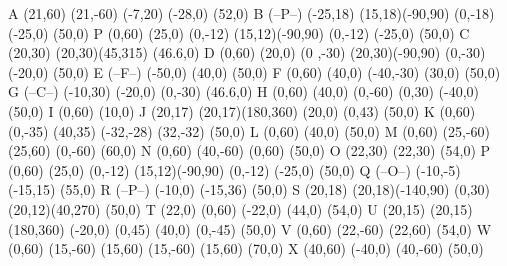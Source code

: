 {\DefineSymbol A{{ \Line(21,60)
   \Line(21,-60)  \Move(-7,20)
   \Line(-28,0) } \Move(52,0)  }
\DefineSymbol B{{ \DrawText(--P--)
   \Move(-25,18)
   \DrawOvalArc(15,18)(-90,90)
   \Move(0,-18)   \Line(-25,0)}
   \Move(50,0) }    \DefineSymbol P
{{      \Line(0,60)    \Line(25,0)
     \Move(0,-12) \DrawOvalArc(15,12)(-90,90)
     \Move(0,-12)  \Line(-25,0) }      \Move(50,0)  }
 \DefineSymbol C{{     \Move(20,30) 
     \DrawOvalArc(20,30)(45,315) }    \Move(46.6,0)  }
 \DefineSymbol D{{    \Line(0,60)    \Line(20,0)
     \Move(0 ,-30) \DrawOvalArc(20,30)(-90,90) \Move(0,-30)
     \Line(-20,0) }   \Move(50,0)  }
 \DefineSymbol E{{  \DrawText(--F--)  \Move(-50,0)
     \Line(40,0) }  \Move(50,0)      }
 \DefineSymbol F{{   \Line(0,60)   \Line(40,0)
     \Move(-40,-30) \Line(30,0)  }  \Move(50,0)     }
 \DefineSymbol G{{ \DrawText(--C--)
    \Move(-10,30) {\Line(-20,0)} \Line(0,-30)   } 
    \Move(46.6,0)     }
 \DefineSymbol H{{ \Line(0,60)  \Move(40,0) 
    \Line(0,-60)  \Move(0,30)  \Line(-40,0)   }  \Move(50,0)     }
 \DefineSymbol I{{ \Line(0,60)  }  \Move(10,0)     }
 \DefineSymbol J{{ \Move(20,17) \DrawOvalArc(20,17)(180,360)
    \Move(20,0) \Line(0,43)   }  \Move(50,0)     }
 \DefineSymbol K{{ \Line(0,60)  \Move(0,-35)
    \Line(40,35) \Move(-32,-28) \Line(32,-32) }  \Move(50,0)     }
 \DefineSymbol L{{ { \Line(0,60) } \Line(40,0)  }  \Move(50,0)     }
 \DefineSymbol M{{ \Line(0,60)  \Line(25,-60)
    \Line(25,60) \Line(0,-60)   }  \Move(60,0)     }
 \DefineSymbol N{{ \Line(0,60) \Line(40,-60)  
    \Line(0,60)  }  \Move(50,0)     }
 \DefineSymbol O{{ \Move(22,30)  \DrawOval(22,30)   }  \Move(54,0)     }
 \DefineSymbol P{{      \Line(0,60)    \Line(25,0)
     \Move(0,-12) \DrawOvalArc(15,12)(-90,90)
     \Move(0,-12)  \Line(-25,0) }      \Move(50,0)  }
 \DefineSymbol Q{{ \DrawText(--O--)  \Move(-10,-5)
     \Line(-15,15)   }  \Move(55,0)     }
 \DefineSymbol R{{ \DrawText(--P--) \Move(-10,0)
     \Line(-15,36)   }  \Move(50,0)     }
 \DefineSymbol S{{  \Move(20,18) \DrawOvalArc(20,18)(-140,90)
     \Move(0,30)  \DrawOvalArc(20,12)(40,270)  }  \Move(50,0)     }
 \DefineSymbol T{{ \Move(22,0) \Line(0,60)  \Move(-22,0)
     \Line(44,0)   }  \Move(54,0)     }
 \DefineSymbol U{{ \Move(20,15)  \DrawOvalArc(20,15)(180,360)
     \Move(-20,0) \Line(0,45) \Move(40,0) \Line(0,-45)   }
     \Move(50,0)     }
 \DefineSymbol V{{ \Move(0,60) \Line(22,-60)
     \Line(22,60)   }  \Move(54,0)     }
 \DefineSymbol W{{  \Move(0,60) \Line(15,-60)
     \Line(15,60)  \Line(15,-60) \Line(15,60)  }  \Move(70,0)     }
 \DefineSymbol X{{ \Line(40,60)  \Move(-40,0)
     \Line(40,-60)   }  \Move(50,0)     }
}
